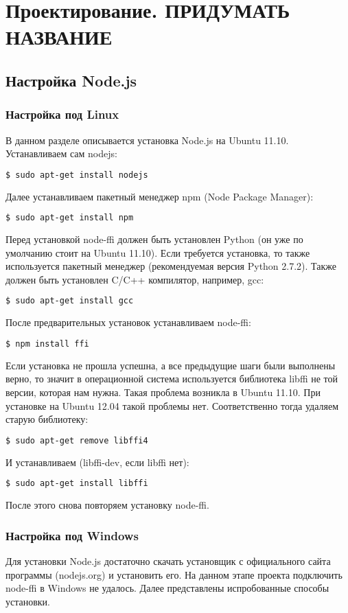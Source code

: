 \chapter{Проектирование. ПРИДУМАТЬ НАЗВАНИЕ}
\section{Настройка Node.js}
\subsection{Настройка под Linux}\label{OnLinuxInstall}
В данном разделе описывается установка Node.js на Ubuntu 11.10.
Устанавливаем сам nodejs:
\begin{lstlisting}[numbers=none, language=bash]
	$ sudo apt-get install nodejs
\end{lstlisting}
Далее устанавливаем пакетный менеджер npm (Node Package Manager):
\begin{lstlisting}[numbers=none, language=bash]
	$ sudo apt-get install npm
\end{lstlisting}
Перед установкой node-ffi должен быть установлен Python (он уже по умолчанию стоит на Ubuntu 11.10). Если требуется установка, то также используется пакетный менеджер (рекомендуемая версия Python 2.7.2).
Также должен быть установлен C/C++ компилятор, например, gcc:
\begin{lstlisting}[numbers=none, language=bash]
	$ sudo apt-get install gcc
\end{lstlisting}
После предварительных установок устанавливаем node-ffi:
\begin{lstlisting}[numbers=none, language=bash]
	$ npm install ffi
\end{lstlisting}
Если установка не прошла успешна, а все предыдущие шаги были выполнены верно, то значит в операционной система используется библиотека libffi не той версии, которая нам нужна. Такая проблема возникла в Ubuntu 11.10. При установке на Ubuntu 12.04 такой проблемы нет. Соответственно тогда удаляем старую библиотеку:
\begin{lstlisting}[numbers=none, language=bash]
	$ sudo apt-get remove libffi4
\end{lstlisting}
И устанавливаем  (libffi-dev, если libffi нет):
\begin{lstlisting}[numbers=none, language=bash]
	$ sudo apt-get install libffi
\end{lstlisting}
После этого снова повторяем установку node-ffi.
\subsection{Настройка под Windows}
Для установки Node.js достаточно скачать установщик с официального сайта программы (nodejs.org) и установить его. На данном этапе проекта подключить node-ffi в Windows не удалось. 
Далее представлены испробованные способы установки.
